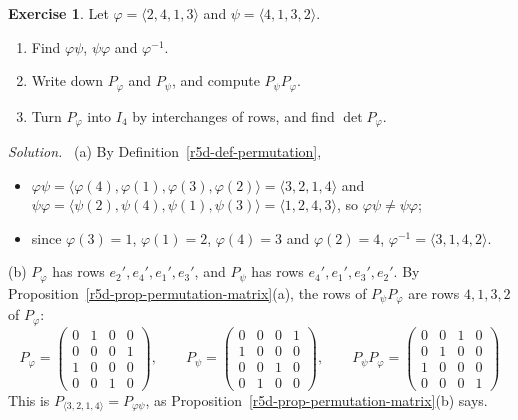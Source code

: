 \documentclass[12pt]{article}
\theoremstyle{definition}
\newtheorem{exercise}{Exercise}
\newenvironment{solution}{\par\noindent\textit{Solution.}\ }{\par\smallskip}
\begin{document}
\begin{exercise}\label{r5d-ex-permutations}
Let \(\varphi=\langle2,4,1,3\rangle\) and \(\psi=\langle4,1,3,2\rangle\).
\begin{enumerate}
\item Find \(\varphi\psi\), \(\psi\varphi\) and \(\varphi^{-1}\).
\item Write down \(P_\varphi\) and \(P_\psi\), and compute \(P_\psi P_\varphi\).
\item Turn \(P_\varphi\) into \(I_4\) by interchanges of rows, and find \(\det P_\varphi\).
\end{enumerate}
\end{exercise}
\begin{solution}
(a) By Definition~\ref{r5d-def-permutation},
\begin{itemize}
\item \(\varphi\psi=\langle\varphi(4),\varphi(1),\varphi(3),\varphi(2)\rangle=\langle3,2,1,4\rangle\) and
\(\psi\varphi=\langle\psi(2),\psi(4),\psi(1),\psi(3)\rangle=\langle1,2,4,3\rangle\), so \(\varphi\psi\ne\psi\varphi\);
\item since \(\varphi(3)=1\), \(\varphi(1)=2\), \(\varphi(4)=3\) and \(\varphi(2)=4\), \(\varphi^{-1}=\langle3,1,4,2\rangle\).
\end{itemize}

(b) \(P_\varphi\) has rows \(e_2',e_4',e_1',e_3'\), and \(P_\psi\) has rows \(e_4',e_1',e_3',e_2'\). By
Proposition~\ref{r5d-prop-permutation-matrix}(a), the rows of \(P_\psi P_\varphi\) are rows \(4,1,3,2\) of \(P_\varphi\):
\[
P_\varphi=\begin{pmatrix}0&1&0&0\\0&0&0&1\\1&0&0&0\\0&0&1&0\end{pmatrix},\qquad
P_\psi=\begin{pmatrix}0&0&0&1\\1&0&0&0\\0&0&1&0\\0&1&0&0\end{pmatrix},\qquad
P_\psi P_\varphi=\begin{pmatrix}0&0&1&0\\0&1&0&0\\1&0&0&0\\0&0&0&1\end{pmatrix}
\]
This is \(P_{\langle3,2,1,4\rangle}=P_{\varphi\psi}\), as Proposition~\ref{r5d-prop-permutation-matrix}(b) says.


\end{solution}
\end{document}

